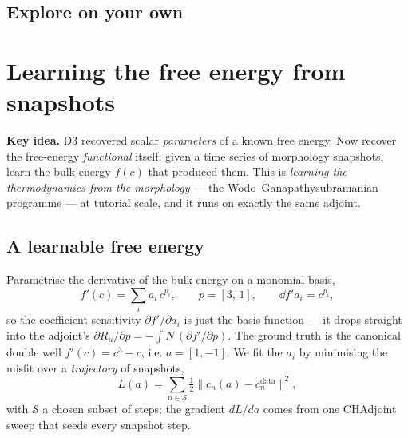 \section{Explore on your own}



\chapter{Learning the free energy from snapshots}
\label{ch:d6}

\begin{keybox}
\textbf{Key idea.} D3 recovered scalar \emph{parameters} of a known free
energy. Now recover the free-energy \emph{functional} itself: given a time
series of morphology snapshots, learn the bulk energy $f(c)$ that produced
them. This is \emph{learning the thermodynamics from the morphology} ---
the Wodo--Ganapathysubramanian programme --- at tutorial scale, and it runs
on exactly the same adjoint.
\end{keybox}

\section{A learnable free energy}

Parametrise the derivative of the bulk energy on a monomial basis,
%
\begin{equation}
  f'(c) = \sum_i a_i\,c^{p_i},
  \qquad p = [3,\,1],
  \qquad \dd{f'}{a_i} = c^{p_i},
  \label{eq:d6basis}
\end{equation}
%
so the coefficient sensitivity $\partial f'/\partial a_i$ is just the
basis function --- it drops straight into the adjoint's $\partial
R_\mu/\partial p = -\!\int N\,(\partial f'/\partial p)$. The ground truth
is the canonical double well $f'(c)=c^3-c$, i.e. $a=[1,-1]$. We fit the
$a_i$ by minimising the misfit over a \emph{trajectory} of snapshots,
%
\begin{equation}
  L(a) = \sum_{n\in\mathcal S}\tfrac12\big\lVert c_n(a)-c_n^{\text{data}}
  \big\rVert^2 ,
\end{equation}
%
with $\mathcal S$ a chosen subset of steps; the gradient $dL/da$ comes
from one CHAdjoint sweep that seeds every snapshot step.

